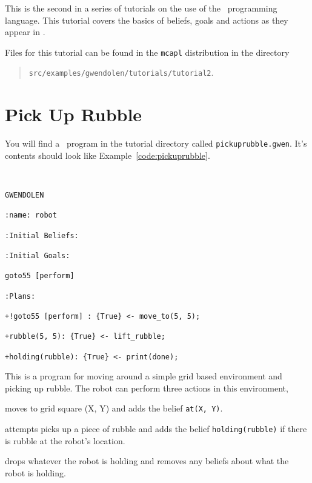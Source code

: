 \label{tutorial:gwendolen:bda}
This is the second in a series of tutorials on the use of
the \gwendolen\ programming language.  This tutorial
covers the basics of beliefs, goals and
actions as they appear in \gwendolen.

Files for this tutorial can be found in the \texttt{mcapl}
distribution in the directory
\begin{quote}
\texttt{src/examples/gwendolen/tutorials/tutorial2}.
\end{quote}

\section{Pick Up Rubble}

\begin{sloppypar}
You will find a \gwendolen\
program in the tutorial
directory called \texttt{pickuprubble.gwen}.  It's contents should
look like Example~\ref{code:pickuprubble}.
\end{sloppypar}
\begin{ourexample}
\label{code:pickuprubble}\quad \\
\begin{lstlisting}[basicstyle=\sffamily,language=Gwendolen,style=easslisting]
GWENDOLEN

:name: robot

:Initial Beliefs:

:Initial Goals:

goto55 [perform]

:Plans:

+!goto55 [perform] : {True} <- move_to(5, 5);

+rubble(5, 5): {True} <- lift_rubble;

+holding(rubble): {True} <- print(done);
\end{lstlisting}
\end{ourexample}
This is a program for moving around a simple grid based
environment and picking up rubble.  The robot can
perform three actions\index{action} in this
environment, 
\begin{description}
\item[move\_to(X, Y)] moves to grid square (X, Y) and adds the belief \lstinline{at(X, Y)}.
\begin{sloppypar}
\item[lift\_rubble] attempts picks up a piece of rubble and adds the belief \lstinline{holding(rubble)} if there is rubble at the robot's location.
\end{sloppypar}
\item[drop] drops whatever the robot is holding and removes any beliefs about what the robot is holding.
\end{description}
